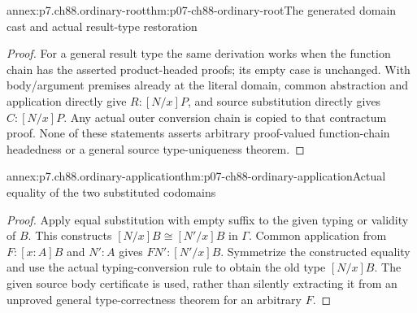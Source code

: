 \begin{annexitem}{annex:p7.ch88.ordinary-root}{thm:p07-ch88-ordinary-root}{The generated domain cast and actual result-type restoration}
\begin{proof}
For a general result type the same derivation works when the function
chain has the asserted product-headed proofs; its empty case is
unchanged. With body/argument premises already at the literal domain,
common abstraction and application directly give \(R:[N/x]P\),
and source substitution directly gives \(C:[N/x]P\). Any actual
outer conversion chain is copied to that contractum proof. None
of these statements asserts arbitrary proof-valued function-chain
headedness or a general source type-uniqueness theorem.
\end{proof}
\end{annexitem}

\begin{annexitem}{annex:p7.ch88.ordinary-application}{thm:p07-ch88-ordinary-application}{Actual equality of the two substituted codomains}
\begin{proof}
Apply equal substitution with empty suffix to the given typing or
validity of \(B\). This constructs
\([N/x]B\cong[N'/x]B\) in \(\Gamma\). Common application from
\(F:[x:A]B\) and \(N':A\) gives
\(FN':[N'/x]B\). Symmetrize the constructed equality and use
the actual typing-conversion rule to obtain the old type
\([N/x]B\). The given source body certificate is used, rather
than silently extracting it from an unproved general type-correctness
theorem for an arbitrary \(F\).
\end{proof}
\end{annexitem}

